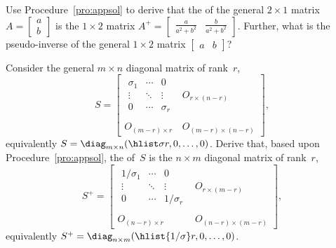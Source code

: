 \begin{exercise} \label{ex:} 
Use Procedure~\ref{pro:appsol} to derive that the  of the general \(2\times 1\) matrix \(A=\begin{bmatrix} a\\b \end{bmatrix}\) is the \(1\times 2\) matrix \(A^+=\begin{bmatrix} \tfrac a{a^2+b^2}&\tfrac b{a^2+b^2} \end{bmatrix}\).  
Further, what is the pseudo-inverse of the general \(1\times2\) matrix \(\begin{bmatrix} a&b \end{bmatrix}\)?
\end{exercise}





\begin{exercise} \label{ex:pidiag} 
Consider the general \(m\times n\) diagonal matrix of rank~\(r\), 
\begin{equation*}
S=\begin{bmatrix} \begin{matrix} \sigma_1&\cdots&0\\
\vdots&\ddots&\vdots\\
0&\cdots&\sigma_r \end{matrix} & 
O_{r\times (n-r)}\\\,\\
O_{(m-r)\times r}&O_{(m-r)\times (n-r)}\end{bmatrix},
\end{equation*}
equivalently \(S=\diag_{m\times n}(\hlist\sigma r,0,\ldots,0)\).
Derive that, based upon Procedure~\ref{pro:appsol}, the  of~\(S\) is the \(n\times m\) diagonal matrix of rank~\(r\),
\begin{equation*}
S^+=\begin{bmatrix} \begin{matrix} 1/{\sigma_1}&\cdots&0\\
\vdots&\ddots&\vdots\\
0&\cdots&1/\sigma_r \end{matrix} & 
O_{r\times (m-r)}\\\,\\
O_{(n-r)\times r}&O_{(n-r)\times (m-r)}\end{bmatrix},
\end{equation*}
equivalently \(S^+=\diag_{n\times m}(\hlist{1/\sigma}r,0,\ldots,0)\).
\end{exercise}






